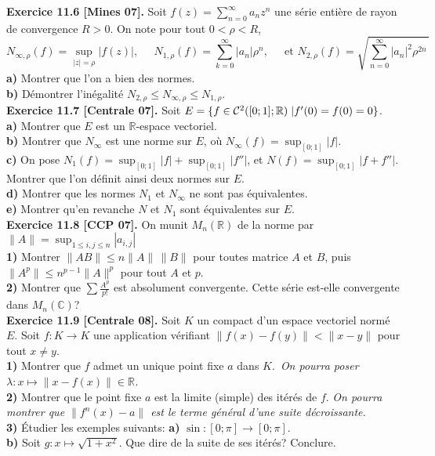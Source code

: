 \documentclass[a4paper,12pt,francais]{article}
\newcommand{\field}[1]{\mathbb{#1}}
\newcommand{\R}{\field{R}}
\newcommand{\C}{\field{C}}
\begin{document}
\noindent
{\bf Exercice 11.6 [Mines 07].} Soit $\displaystyle f(z)= \sum_{n=0}^\infty a_n z^n$ une série entière de rayon de convergence $R>0$. On note pour tout $0<\rho<R$,
$$N_{\infty, \rho}(f)=\sup_{|z|=\rho} |f(z)|, \; \; \; \; \; N_{1,\rho}(f)=\sum_{k=0}^\infty |a_n| \rho^n,\; \; \; \; \mbox{ et } N_{2,\rho}(f)=\sqrt{\sum_{n=0}^\infty |a_n|^2 \rho^{2n}\,}$$
\indent
{\bf a)} Montrer que l'on a bien des normes.\\
\indent
{\bf b)} Démontrer l'inégalité $N_{2,\rho} \leqslant N_{\infty,\rho} \leqslant N_{1,\rho}$.\\

\noindent
{\bf Exercice 11.7 [Centrale 07].} Soit $E=\{f\in {\cal{C}}^2([0;1];\R)\; | f'(0)=f(0)=0 \}$.\\
\indent
{\bf a)} Montrer que $E$ est un $\R$-espace vectoriel.\\
\indent
{\bf b)} Montrer que $N_\infty$ est une norme sur $E$, où $N_\infty(f)=\sup_{[0;1]}|f|$.\\
\indent
{\bf c)} On pose $N_1(f)=\sup_{[0;1]}|f|+\sup_{[0;1]}|f''|$, et $N(f)=\sup_{[0;1]}|f+f''|$. Montrer que l'on définit ainsi deux normes sur $E$.\\
\indent
{\bf d)} Montrer que les normes $N_1$ et $N_\infty$ ne sont pas équivalentes.\\
\indent
{\bf e)} Montrer qu'en revanche $N$ et $N_1$ sont équivalentes sur $E$.\\

\noindent
{\bf Exercice 11.8 [CCP 07].} On munit $M_n(\R)$ de la norme par $\displaystyle \|A\|=\sup_{1\leqslant i,j\leqslant n} |a_{i,j}|$\\
{\bf 1)} Montrer $\|AB\| \leqslant n \|A\| \, \|B\|$ pour toutes matrice $A$ et $B$, puis $\|A^p\|\leqslant n^{p-1} \|A\|^p$ pour tout $A$ et $p$.\\
{\bf 2)} Montrer que $\sum \frac{A^p}{p!}$ est absolument convergente. Cette série est-elle convergente dans $M_n(\C)$?\\

\noindent
{\bf Exercice 11.9 [Centrale 08].} Soit $K$ un compact d'un espace vectoriel normé $E$. Soit $f:K \to K$ une  application 
vérifiant $\|f(x)-f(y)\|<\|x-y\|$ pour tout $x\neq y$.\\
{\bf 1)} Montrer que $f$ admet un unique point fixe $a$ dans $K$.\ {\it On pourra poser $\lambda: x \mapsto \|x-f(x)\|\in  \R$.} \\
{\bf 2)} Montrer que le point fixe $a$ est la limite (simple) des itérés de $f$. {\it On pourra montrer que $\|f^n(x)-a\|$ est le terme général d'une suite décroissante.}\\
{\bf 3)} \'Etudier les exemples suivants: {\bf a)} $\sin: [0;\pi]\to [0;\pi]$.\\
 {\bf b)} Soit $g:x \mapsto\sqrt{1+x^2}$. Que dire de la suite de ses itérés? Conclure.\\ 
\end{document}
